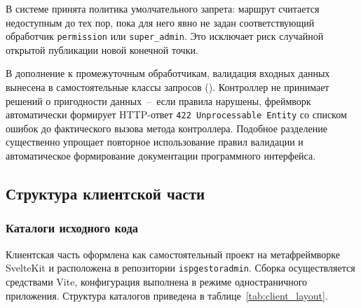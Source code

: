 В системе принята политика умолчательного запрета: маршрут считается недоступным до тех пор, пока для него явно не задан соответствующий обработчик \texttt{permission} или \texttt{super\_admin}. Это исключает риск случайной открытой публикации новой конечной точки.

В дополнение к промежуточным обработчикам, валидация входных данных вынесена в самостоятельные классы запросов (). Контроллер не принимает решений о пригодности данных~--~если правила нарушены, фреймворк автоматически формирует HTTP-ответ \texttt{422 Unprocessable Entity} со списком ошибок до фактического вызова метода контроллера. Подобное разделение существенно упрощает повторное использование правил валидации и автоматическое формирование документации программного интерфейса.

\subsection{Структура клиентской части}

\subsubsection{Каталоги исходного кода}

Клиентская часть оформлена как самостоятельный проект на метафреймворке SvelteKit и расположена в репозитории \texttt{ispgestoradmin}. Сборка осуществляется средствами Vite, конфигурация выполнена в режиме одностраничного приложения. Структура каталогов приведена в таблице~\ref{tab:client_layout}.

